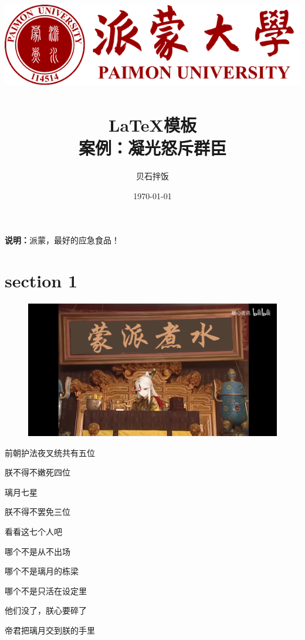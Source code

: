 \documentclass[UTF8, 12pt, A4paper]{article}
\title{
    \includegraphics[scale=1]{PMU-logo.pdf} \\ %
    ~\\
    \LaTeX 模板 \\ 案例：凝光怒斥群臣
    }
\author{贝石拌饭\footnotemark[1] \footnotemark[2]}
\date{\today}
\begin{document}
\maketitle
{} %
\thispagestyle{empty} %

\textbf{说明：}派蒙，最好的应急食品！



\newpage
\setcounter{page}{1} %
\tableofcontents

\newpage
\setcounter{page}{1}

\section{section 1}

\begin{figure}[ht]
    \centering
    \includegraphics[width=15cm]{蒙派煮水.png}
\end{figure}

前朝护法夜叉统共有五位

朕不得不嫩死四位

璃月七星

朕不得不罢免三位

看看这七个人吧

哪个不是从不出场

哪个不是璃月的栋梁

哪个不是只活在设定里

他们没了，朕心要碎了

帝君把璃月交到朕的手里
\end{document}
